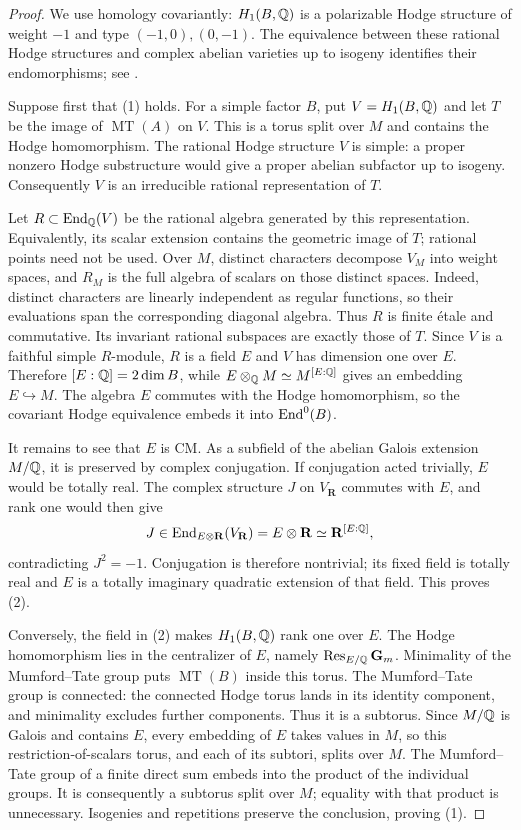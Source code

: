 \begin{proof}
We use homology covariantly: $H_1(B,\mathbb Q)$ is a polarizable Hodge structure
of weight $-1$ and type $(-1,0),(0,-1)$. The equivalence between these
rational Hodge structures and complex abelian varieties up to isogeny
identifies their endomorphisms; see \cite[Theorem~6.8 and Corollary~6.9]{MilneShimura2017}.

Suppose first that (1) holds. For a simple factor $B$, put
$V=H_1(B,\mathbb Q)$ and let $T$ be the image of $\operatorname{MT}(A)$ on $V$.
This is a torus split over $M$ and contains the Hodge homomorphism.
The rational Hodge structure $V$ is simple: a proper nonzero Hodge
substructure would give a proper abelian subfactor up to isogeny.
Consequently $V$ is an irreducible rational representation of $T$.

Let $R\subset\operatorname{End}_{\mathbb Q}(V)$ be the rational algebra generated by this
representation. Equivalently, its scalar extension contains the geometric
image of $T$; rational points need not be used. Over $M$, distinct
characters decompose $V_M$ into weight spaces, and $R_M$ is the full
algebra of scalars on those distinct spaces. Indeed, distinct characters
are linearly independent as regular functions, so their evaluations span
the corresponding diagonal algebra. Thus $R$ is finite \'etale and
commutative. Its invariant rational subspaces are exactly those of $T$.
Since $V$ is a faithful simple $R$-module, $R$ is a field $E$ and $V$ has
dimension one over $E$. Therefore $[E:\mathbb Q]=2\dim B$, while
$E\otimes_{\mathbb Q}M\simeq M^{[E:\mathbb Q]}$ gives an embedding $E\hookrightarrow M$.
The algebra $E$ commutes with the Hodge homomorphism, so the covariant
Hodge equivalence embeds it into $\operatorname{End}^0(B)$.

It remains to see that $E$ is CM. As a subfield of the abelian Galois
extension $M/\mathbb Q$, it is preserved by complex conjugation. If conjugation
acted trivially, $E$ would be totally real. The complex structure $J$ on
$V_{\mathbf R}$ commutes with $E$, and rank one would then give
\[
 J\in\operatorname{End}_{E\otimes\mathbf R}(V_{\mathbf R})
       =E\otimes\mathbf R\simeq\mathbf R^{[E:\mathbb Q]},
\]
contradicting $J^2=-1$. Conjugation is therefore nontrivial; its fixed
field is totally real and $E$ is a totally imaginary quadratic extension
of that field. This proves (2).

Conversely, the field in (2) makes $H_1(B,\mathbb Q)$ rank one over $E$.
The Hodge homomorphism lies in the centralizer of $E$, namely
$\operatorname{Res}_{E/\mathbb Q}\mathbf G_m$. Minimality of the Mumford--Tate
group puts $\operatorname{MT}(B)$ inside this torus. The Mumford--Tate
group is connected: the connected Hodge torus lands in its identity
component, and minimality excludes further components. Thus it is a
subtorus. Since $M/\mathbb Q$ is Galois and contains $E$, every embedding of
$E$ takes values in $M$, so this restriction-of-scalars torus, and each
of its subtori, splits over $M$.
The Mumford--Tate group of a finite direct sum embeds into the product
of the individual groups. It is consequently a subtorus split over $M$;
equality with that product is unnecessary. Isogenies and repetitions
preserve the conclusion, proving (1).


\end{proof}
